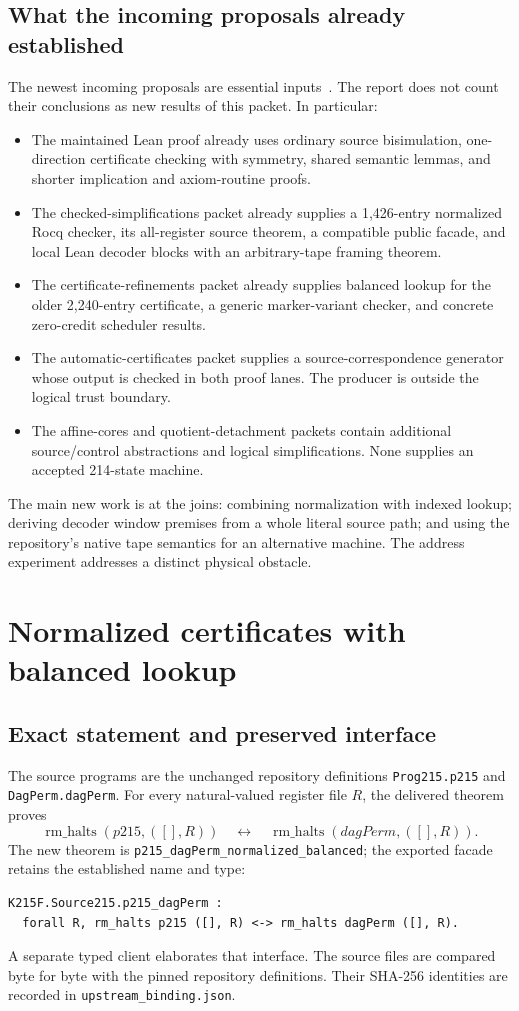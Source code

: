 \documentclass[11pt,letterpaper]{article}
\newcommand{\code}[1]{\texttt{#1}}
\begin{document}
\subsection{What the incoming proposals already established}
The newest incoming proposals are essential inputs~\cite{incoming}. The report does not count their conclusions as new results of this packet. In particular:
\begin{itemize}
\item The maintained Lean proof already uses ordinary source bisimulation, one-direction certificate checking with symmetry, shared semantic lemmas, and shorter implication and axiom-routine proofs.
\item The checked-simplifications packet already supplies a 1,426-entry normalized Rocq checker, its all-register source theorem, a compatible public facade, and local Lean decoder blocks with an arbitrary-tape framing theorem.
\item The certificate-refinements packet already supplies balanced lookup for the older 2,240-entry certificate, a generic marker-variant checker, and concrete zero-credit scheduler results.
\item The automatic-certificates packet supplies a source-correspondence generator whose output is checked in both proof lanes. The producer is outside the logical trust boundary.
\item The affine-cores and quotient-detachment packets contain additional source/control abstractions and logical simplifications. None supplies an accepted 214-state machine.
\end{itemize}
The main new work is at the joins: combining normalization with indexed lookup; deriving decoder window premises from a whole literal source path; and using the repository's native tape semantics for an alternative machine. The address experiment addresses a distinct physical obstacle.

\section{Normalized certificates with balanced lookup}
\label{sec:balanced}
\subsection{Exact statement and preserved interface}
The source programs are the unchanged repository definitions \code{Prog215.p215} and \code{DagPerm.dagPerm}. For every natural-valued register file $R$, the delivered theorem proves
\[
 \operatorname{rm\_halts}(p215,([],R))
 \quad\longleftrightarrow\quad
 \operatorname{rm\_halts}(dagPerm,([],R)).
\]
The new theorem is \code{p215\_dagPerm\_normalized\_balanced}; the exported facade retains the established name and type:
\begin{lstlisting}
K215F.Source215.p215_dagPerm :
  forall R, rm_halts p215 ([], R) <-> rm_halts dagPerm ([], R).
\end{lstlisting}
A separate typed client elaborates that interface. The source files are compared byte for byte with the pinned repository definitions. Their SHA-256 identities are recorded in \code{upstream\_binding.json}.
\end{document}

